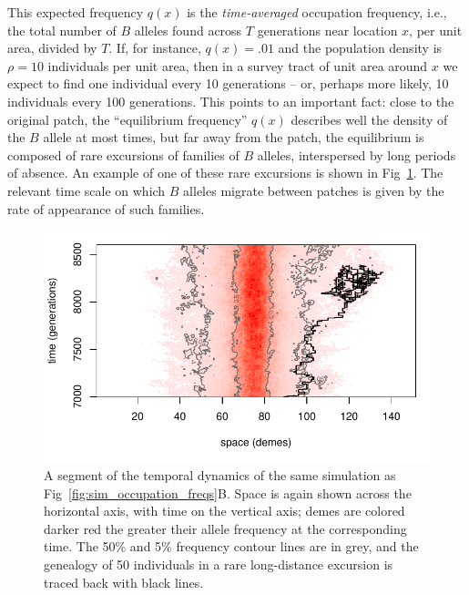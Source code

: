 \documentclass{article}
\begin{document}
This expected frequency $q(x)$ is the \emph{time-averaged} occupation frequency,
i.e., the total number of $B$ alleles found across $T$ generations near location $x$, per unit area, divided by $T$.
If, for instance, $q(x)=.01$ and the population density is $\rho=10$ individuals per unit area, 
then in a survey tract of unit area around $x$ we expect to find one individual every 10 generations
-- or, perhaps more likely, 10 individuals every 100 generations.
This points to an important fact: 
close to the original patch, the ``equilibrium frequency'' $q(x)$ describes well the density of the $B$ allele at most times,
but far away from the patch, 
the equilibrium is composed of rare excursions of families of $B$
alleles, interspersed by long periods of absence. 
An example of one of these rare excursions is shown in Fig~\ref{fig:sim_snapshots}.
The relevant time scale on which $B$ alleles migrate between patches is given by the rate of appearance of such families.

\begin{figure}[ht!]
  \begin{center}
    \includegraphics{sim-snapshots}
  \end{center}
  \caption{
  A segment of the temporal dynamics of the same simulation as Fig~\ref{fig:sim_occupation_freqs}B.
  Space is again shown across the horizontal axis, with time on the vertical axis; 
  demes are colored darker red the greater their allele frequency at the corresponding time.
  The 50\% and 5\% frequency contour lines are in grey,
  and the genealogy of 50 individuals in a rare long-distance excursion is traced back with black lines.
  }   \label{fig:sim_snapshots}
\end{figure}
\end{document}
